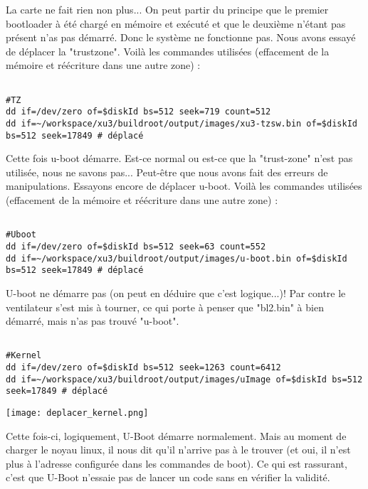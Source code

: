 La carte ne fait rien non plus... On peut partir du principe que le premier bootloader à été chargé en mémoire et exécuté et que le deuxième n'étant pas présent n'as pas démarré. Donc le système ne fonctionne pas. 
Nous avons essayé de déplacer la "trustzone". Voilà les commandes utilisées (effacement de la mémoire et réécriture dans une autre zone) : 
\begin{lstlisting}[frame=single,style=Console]  % Start your code-block

#TZ
dd if=/dev/zero of=$diskId bs=512 seek=719 count=512
dd if=~/workspace/xu3/buildroot/output/images/xu3-tzsw.bin of=$diskId bs=512 seek=17849 # déplacé
\end{lstlisting}

Cette fois u-boot démarre. Est-ce normal ou est-ce que la "trust-zone" n'est pas utilisée, nous ne savons pas... Peut-être que nous avons fait des erreurs de manipulations. Essayons encore de déplacer u-boot. 
Voilà les commandes utilisées (effacement de la mémoire et réécriture dans une autre zone) : 

\begin{lstlisting}[frame=single,style=Console]  % Start your code-block

#Uboot
dd if=/dev/zero of=$diskId bs=512 seek=63 count=552
dd if=~/workspace/xu3/buildroot/output/images/u-boot.bin of=$diskId bs=512 seek=17849 # déplacé
\end{lstlisting}

U-boot ne démarre pas (on peut en déduire que c'est logique...)! Par contre le ventilateur s'est mis à tourner, ce qui porte à penser que "bl2.bin" à bien démarré, mais n'as pas trouvé "u-boot".

\begin{lstlisting}[frame=single,style=Console]  % Start your code-block

#Kernel
dd if=/dev/zero of=$diskId bs=512 seek=1263 count=6412
dd if=~/workspace/xu3/buildroot/output/images/uImage of=$diskId bs=512 seek=17849 # déplacé
\end{lstlisting}

\begin{center} 
\hspace{15cm}
\texttt{[image: deplacer\_kernel.png]}
\end{center}
\vspace{0.5cm}

Cette fois-ci, logiquement, U-Boot démarre normalement. Mais au moment de charger le noyau linux, il nous dit qu'il n'arrive pas à le trouver (et oui, il n'est plus à l'adresse configurée dans les commandes de boot). Ce qui est rassurant, c'est que U-Boot n'essaie pas de lancer un code sans en vérifier la validité.

